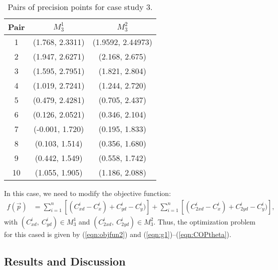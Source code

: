 \documentclass[12pt,letterpape]{article}
\begin{document}
\begin{itemize}
\begin{table}[!ht]
	\centering
	\begin{tabular}{ccc}
			\hline
			Pair  &    $M_{3}^1$    &    $M_{3}^2$      \\
			\hline
			1 & (1.768, 2.3311) & (1.9592, 2.44973) \\
			2 & (1.947, 2.6271) & (2.168, 2.675)    \\
			3 & (1.595, 2.7951) & (1.821, 2.804)    \\
			4 & (1.019, 2.7241) & (1.244, 2.720)    \\
			5 & (0.479, 2.4281) & (0.705, 2.437)    \\
			6 & (0.126, 2.0521) & (0.346, 2.104)    \\
			7 & (-0.001, 1.720) & (0.195, 1.833)    \\
			8 & (0.103, 1.514)  & (0.356, 1.680)    \\
			9 & (0.442, 1.549)  & (0.558, 1.742)    \\
		   10 & (1.055, 1.905)  & (1.186, 2.088)    \\
			\hline
	\end{tabular}
	\caption{Pairs of precision points for case study 3.}
\end{table}
In this case, we need to modify the objective function:
\begin{align}
	f(\vec{p}) &= \sum_{i=1}^n \left[ (C_{xd}^i - C_x^i) + C_{yd}^i - C_y^i) \right]
	+ \sum_{i=1}^n \left[ (C_{2xd}^i - C_x^i) + C_{2yd}^i - C_y^i) \right],
	\label{eqn:objfun2}
\end{align}
with $(C_{xd}^i,\ C_{yd}^i) \in M_3^1 $ and $(C_{2xd}^i,\ C_{2yd}^i) \in M_3^2 $.
Thus, the optimization problem for this cased is given by (\ref{eqn:objfun2}) and
 (\ref{eqn:g1})--(\ref{eqn:COPtheta}).

\end{itemize}


\subsection{Results and Discussion} %
\label{sec:results1}
\end{document}
